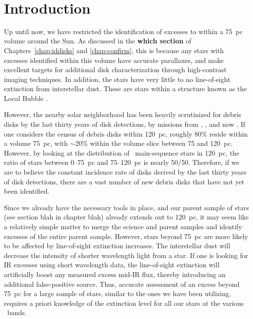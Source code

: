 \section{Introduction}

    Up until now, we have restricted the identification of excesses to within a 75~pc volume around the Sun. As discussed in the \textbf{which section} of Chapters~\ref{chap:iddisks} and \ref{chap:confirm}, this is because any stars with excesses identified within this volume have accurate parallaxes, and make excellent targets for additional disk characterization through high-contrast imaging techniques. In addition, the stars have very little to no line-of-sight extinction from interstellar dust. These are stars within a structure known as the Local Bubble \citep{Lallement2003}. 
    
    
    However, the nearby solar neighborhood has been heavily scrutinized for debris disks by the last thirty years of disk detections, by missions from \iras, \spitzer, and now \WS. If one considers the census of debris disks within 120~pc, roughly 80\%  reside within a volume 75~pc, with $\sim$20\% within the volume slice between 75 and 120~pc. However, by looking at the distribution of \hip\ main-sequence stars in 120~pc, the ratio of stars between 0--75~pc and 75--120~pc is nearly 50/50. Therefore, if we are to believe the constant incidence rate of disks derived by the last thirty years of disk detections, there are a vast number of new debris disks that have not yet been identified. 
    
    
    Since we already have the necessary tools in place, and our parent sample of stars (see section blah in chapter blah) already extends out to 120~pc, it may seem like a relatively simple matter to merge the science and parent samples and identify excesses of the entire parent sample. However, stars beyond 75~pc are more likely to be affected by line-of-sight extinction increases. The interstellar dust will decrease the intensity of shorter wavelength light from a star. If one is looking for IR excesses using short wavelength data, the line-of-sight extinction will artificially boost any measured excess mid-IR flux, thereby introducing an additional false-positive source. Thus, accurate assessment of an excess beyond 75~pc for a large sample of stars, similar to the ones we have been utilizing, requires a priori knowledge of the extinction level for all our stars at the various \WS\ bands.
    
